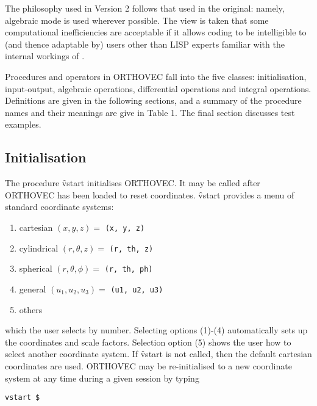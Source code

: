 The philosophy used in Version 2 follows that used in the original:
namely, algebraic mode is used wherever possible.  The view is taken
that some computational inefficiencies are acceptable if it allows
coding to be intelligible to (and thence adaptable by) users other
than LISP experts familiar with the internal workings of \REDUCE.

Procedures and operators in \textsc{ORTHOVEC} fall into the five classes: 
initialisation, input-output, algebraic operations, differential
operations and integral operations.  Definitions are given in 
the following sections, and
a summary of the procedure names and their meanings are give in Table 1.
The final section discusses test examples.

\subsection{Initialisation}\label{vstart}
\hypertarget{command:VSTART}{}
The procedure \f{vstart} initialises \textsc{ORTHOVEC}.  It may be
called after \textsc{ORTHOVEC} has been loaded to reset coordinates.
\f{vstart} provides a
menu of standard coordinate systems:

\begin{enumerate}
\item cartesian $(x, y, z) = $ \texttt{(x, y, z)}
\item cylindrical $(r, \theta, z) = $ \texttt{(r, th, z)}
\item spherical $(r, \theta, \phi) = $ \texttt{(r, th, ph) }
\item general $( u_1, u_2, u_3 ) = $ \texttt{(u1, u2, u3) }
\item others
\end{enumerate}

which the user selects by number.  Selecting options (1)-(4)
automatically sets up the coordinates and scale factors.  Selection
option (5) shows the user how to select another coordinate system.  If
\f{vstart} is not called, then the default cartesian coordinates are used.
\textsc{ORTHOVEC} may be re-initialised to a new coordinate system at any time
during a given \REDUCE session by typing
\begin{verbatim}
vstart $
\end{verbatim}

